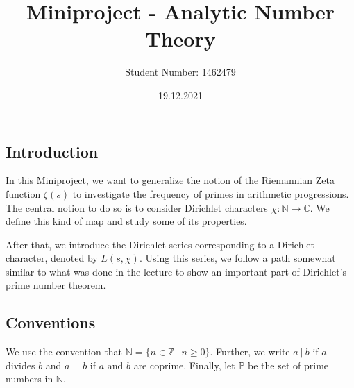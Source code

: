 \documentclass{scrartcl}
\title{Miniproject - Analytic Number Theory}
\author{Student Number: 1462479}
\date{19.12.2021}
\newcommand{\primes}{\mathbb{P}}
\newcommand{\N}{\mathbb{N}}
\newcommand{\Z}{\mathbb{Z}}
\newcommand{\C}{\mathbb{C}}
\newcommand{\divides}{\ | \ }
\theoremstyle{definition}
\begin{document}
\maketitle

\subsection*{Introduction}
In this Miniproject, we want to generalize the notion of the Riemannian Zeta function $\zeta(s)$ to investigate the frequency of primes in arithmetic progressions.
The central notion to do so is to consider Dirichlet characters $\chi: \N \to \C$.
We define this kind of map and study some of its properties.

After that, we introduce the Dirichlet series corresponding to a Dirichlet character, denoted by $L(s, \chi)$.
Using this series, we follow a path somewhat similar to what was done in the lecture to show an important part of Dirichlet's prime number theorem.

\subsection*{Conventions}
We use the convention that $\N = \{ n \in \Z \ | \ n \geq 0 \}$.
Further, we write $a \divides b$ if $a$ divides $b$ and $a \perp b$ if $a$ and $b$ are coprime.
Finally, let $\primes$ be the set of prime numbers in $\N$.
\end{document}
